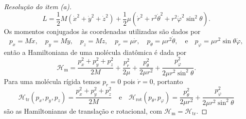 \begin{proof}[Resolução do item (a)]
    \begin{equation*}
        L = \frac12 M\left(\dot{x}^2 + \dot{y}^2 + \dot{z}^2\right) + \frac12 \mu \left(\dot{r}^2 + r^2\dot{\theta}^2 + r^2\dot{\varphi}^2\sin^2\theta\right).
    \end{equation*}
    Os momentos conjugados às coordenadas utilizadas são dados por
    \begin{equation*}
        p_x = M \dot{x},\quad
        p_y = M \dot{y},\quad
        p_z = M \dot{z},\quad
        p_r = \mu \dot{r},\quad
        p_\theta = \mu r^2\dot{\theta},\quad\text{e}\quad
        p_{\varphi} = \mu r^2 \sin\theta\dot{\varphi},
    \end{equation*}
    então a Hamiltoniana de uma molécula diatômica é dada por
    \begin{equation*}
        \mathcal{H}_{\mathrm{m}} = \frac{p_x^2 + p_y^2 + p_z^2}{2M} + \frac{p_r^2}{2\mu} + \frac{p_\theta^2}{2\mu r^2} + \frac{p_\varphi^2}{2\mu r^2 \sin^2\theta}.
    \end{equation*}
    Para uma molécula rígida temos \(p_r = 0\) pois \(\dot{r} = 0\), portanto
    \begin{equation*}
        \mathcal{H}_{\mathrm{tr}}(p_x, p_y, p_z) = \frac{p_x^2 + p_y^2 + p_z^2}{2M}
        \quad\text{e}\quad
        \mathcal{H}_{\mathrm{rot}}(p_\theta, p_\varphi) = \frac{p_\theta^2}{2\mu r^2} + \frac{p_\varphi^2}{2\mu r^2 \sin^2\theta}
    \end{equation*}
    são as Hamiltonianas de translação e rotacional, com \(\mathcal{H}_{\mathrm{m}} = \mathcal{H}_{\mathrm{tr}}\).


\end{proof}
